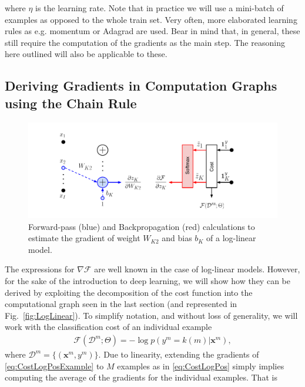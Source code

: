 \noindent where $\eta$ is the learning rate. Note that in practice we will use
a mini-batch of examples as opposed to the whole train set. Very often, more
elaborated learning rules as e.g. momentum or Adagrad are used. Bear in mind
that, in general, these still require the computation of the gradients as the
main step. The reasoning here outlined will also be applicable to these.  

\subsection{Deriving Gradients in Computation Graphs using the Chain Rule}

\begin{figure}[!h]
\centering
\includegraphics[scale=0.6]{figs/deep_learning/LogLin_color.pdf}
\caption{Forward-pass (blue) and Backpropagation (red) calculations to estimate the gradient of weight $W_{K2}$ and bias $b_K$ of a log-linear model.}
\label{fig:LogLinColor}
\end{figure}

The expressions for $\nabla\mathcal{F}$ are well known in the case of log-linear models. However, for
the sake of the introduction to deep learning, we will show how they can
be derived by exploiting the decomposition of the cost function into the computational
graph seen in the last section (and represented in Fig.~\ref{fig:LogLinear}). To simplify notation, and without loss of generality, we will work with the 
classification cost of an individual example 
%
\begin{align}
\mathcal{F}(\mathcal{D}^m;\Theta) 
= -\log p(y^m=k(m) | \mathbf{x}^m), 
\label{eq:CostLogPosExample}
\end{align}
%
where $\mathcal{D}^m=\{(\mathbf{x}^m, y^m)\}$. Due to linearity, extending the
gradients of \ref{eq:CostLogPosExample} to $M$ examples as in
\ref{eq:CostLogPos} simply implies computing the average of the gradients for
the individual examples. That is



